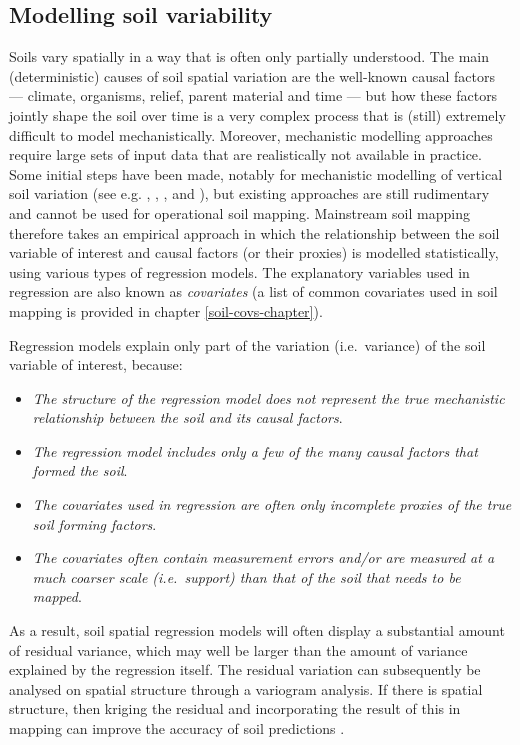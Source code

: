\documentclass[graybox,natbib,nospthms,UStrade]{svmono}
\begin{document}
\hypertarget{modelling-soil-variability}{%
\subsection{Modelling soil variability}\label{modelling-soil-variability}}

Soils vary spatially in a way that is often only partially understood.
The main (deterministic) causes of soil spatial variation are the
well-known causal factors --- climate, organisms, relief, parent
material and time --- but how these factors jointly shape the soil over time is a
very complex process that is (still) extremely difficult to model
mechanistically. Moreover, mechanistic modelling approaches require
large sets of input data that are realistically not available in practice. Some
initial steps have been made, notably for mechanistic modelling of
vertical soil variation (see e.g. \citet{Finke2008462},
\citet{Sommer2008480}, \citet{Minasny2008140}, and \citet{vanwalleghem2010spatial}), but
existing approaches are still rudimentary and cannot be used for
operational soil mapping. Mainstream soil mapping therefore takes an
empirical approach in which the relationship between the soil variable
of interest and causal factors (or their proxies) is modelled
statistically, using various types of regression models. The explanatory
variables used in regression are also known as \emph{covariates} (a list of
common covariates used in soil mapping is provided in chapter \ref{soil-covs-chapter}).

Regression models explain only part of the variation (i.e.~variance) of
the soil variable of interest, because:

\begin{itemize}
\item
  \emph{The structure of the regression model does not represent the true
  mechanistic relationship between the soil and its causal factors}.
\item
  \emph{The regression model includes only a few of the many causal factors
  that formed the soil}.
\item
  \emph{The covariates used in regression are often only incomplete proxies of the
  true soil forming factors}.
\item
  \emph{The covariates often contain measurement errors and/or are measured
  at a much coarser scale (i.e.~support) than that of the soil that
  needs to be mapped}.
\end{itemize}

As a result, soil spatial regression models will often display a
substantial amount of residual variance, which may well be larger than
the amount of variance explained by the regression itself. The residual
variation can subsequently be analysed on spatial structure through a
variogram analysis. If there is spatial structure, then kriging the
residual and incorporating the result of this in mapping can improve the
accuracy of soil predictions \citep{hengl2007regression}.
\end{document}
